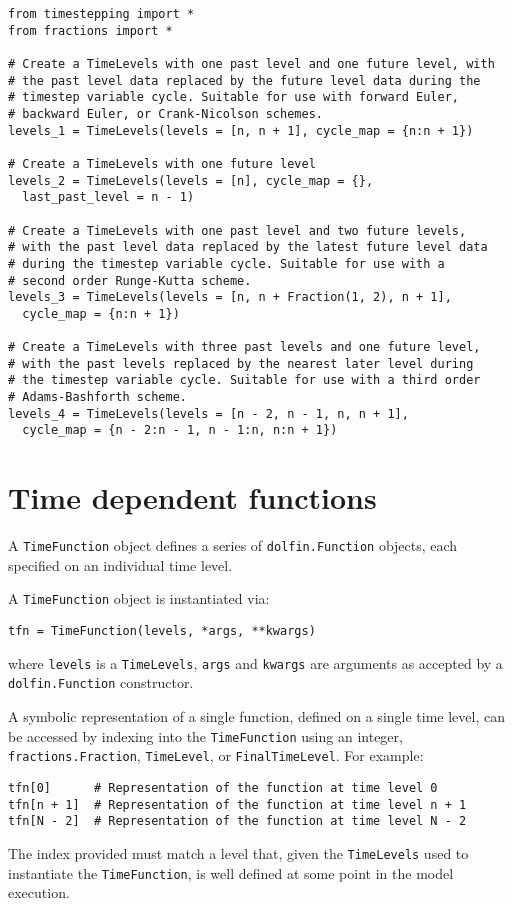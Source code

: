 \documentclass[a4paper]{book}
\begin{document}
\begin{lstlisting}
from timestepping import *
from fractions import *

# Create a TimeLevels with one past level and one future level, with
# the past level data replaced by the future level data during the
# timestep variable cycle. Suitable for use with forward Euler,
# backward Euler, or Crank-Nicolson schemes.
levels_1 = TimeLevels(levels = [n, n + 1], cycle_map = {n:n + 1})

# Create a TimeLevels with one future level
levels_2 = TimeLevels(levels = [n], cycle_map = {},
  last_past_level = n - 1)

# Create a TimeLevels with one past level and two future levels,
# with the past level data replaced by the latest future level data
# during the timestep variable cycle. Suitable for use with a
# second order Runge-Kutta scheme.
levels_3 = TimeLevels(levels = [n, n + Fraction(1, 2), n + 1],
  cycle_map = {n:n + 1})

# Create a TimeLevels with three past levels and one future level,
# with the past levels replaced by the nearest later level during
# the timestep variable cycle. Suitable for use with a third order
# Adams-Bashforth scheme.
levels_4 = TimeLevels(levels = [n - 2, n - 1, n, n + 1],
  cycle_map = {n - 2:n - 1, n - 1:n, n:n + 1})
\end{lstlisting}

\section{Time dependent functions}

A \verb+TimeFunction+ object defines a series of \verb+dolfin.Function+ objects,
each specified on an individual time level.

A \verb+TimeFunction+ object is instantiated via:
\begin{lstlisting}
tfn = TimeFunction(levels, *args, **kwargs)
\end{lstlisting}
where \verb+levels+ is a \verb+TimeLevels+, \verb+args+ and \verb+kwargs+ are
arguments as accepted by a \verb+dolfin.Function+ constructor.

A symbolic representation of a single function, defined on a single time level,
can be accessed by indexing into the \verb+TimeFunction+ using an integer,
\verb+fractions.Fraction+, \verb+TimeLevel+, or \verb+FinalTimeLevel+. For
example:
\begin{lstlisting}
tfn[0]      # Representation of the function at time level 0
tfn[n + 1]  # Representation of the function at time level n + 1
tfn[N - 2]  # Representation of the function at time level N - 2
\end{lstlisting}
The index provided must match a level that, given the \verb+TimeLevels+ used to
instantiate the \verb+TimeFunction+, is well defined at some point in the model
execution.
\end{document}
